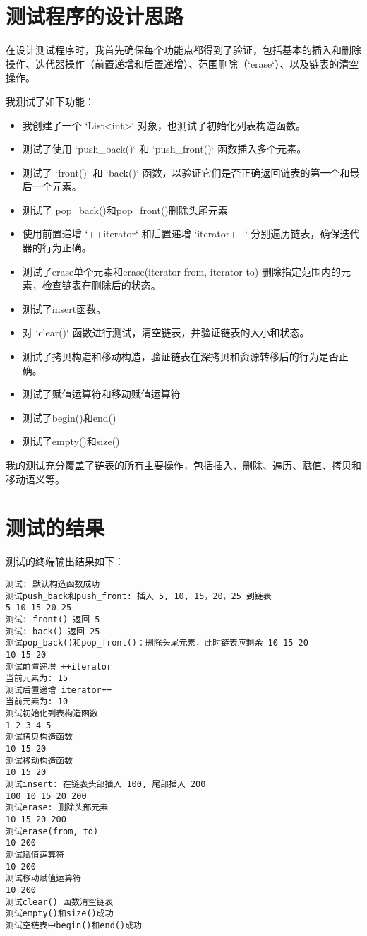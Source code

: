 \documentclass[UTF8]{ctexart}
\begin{document}
\pagestyle{fancy}
\fancyhead{}

\section{测试程序的设计思路}

在设计测试程序时，我首先确保每个功能点都得到了验证，包括基本的插入和删除操作、迭代器操作（前置递增和后置递增）、范围删除（`erase`）、以及链表的清空操作。

我测试了如下功能：
\begin{itemize}
    \item 我创建了一个 `List<int>` 对象，也测试了初始化列表构造函数。
    \item 测试了使用 `push\_back()` 和 `push\_front()` 函数插入多个元素。
    \item 测试了 `front()` 和 `back()` 函数，以验证它们是否正确返回链表的第一个和最后一个元素。
    \item 测试了 pop\_back()和pop\_front()删除头尾元素
    \item 使用前置递增 `++iterator` 和后置递增 `iterator++` 分别遍历链表，确保迭代器的行为正确。
    \item 测试了erase单个元素和erase(iterator from, iterator to) 删除指定范围内的元素，检查链表在删除后的状态。
    \item 测试了insert函数。
    \item 对 `clear()` 函数进行测试，清空链表，并验证链表的大小和状态。
    \item 测试了拷贝构造和移动构造，验证链表在深拷贝和资源转移后的行为是否正确。
    \item 测试了赋值运算符和移动赋值运算符
    \item 测试了begin()和end()
    \item 测试了empty()和size()
    
\end{itemize}

我的测试充分覆盖了链表的所有主要操作，包括插入、删除、遍历、赋值、拷贝和移动语义等。

\section{测试的结果}

测试的终端输出结果如下：
\begin{verbatim}
测试: 默认构造函数成功
测试push_back和push_front: 插入 5, 10, 15，20，25 到链表
5 10 15 20 25
测试: front() 返回 5
测试: back() 返回 25
测试pop_back()和pop_front()：删除头尾元素，此时链表应剩余 10 15 20
10 15 20
测试前置递增 ++iterator
当前元素为: 15
测试后置递增 iterator++
当前元素为: 10
测试初始化列表构造函数
1 2 3 4 5
测试拷贝构造函数
10 15 20
测试移动构造函数
10 15 20
测试insert: 在链表头部插入 100, 尾部插入 200
100 10 15 20 200
测试erase: 删除头部元素
10 15 20 200
测试erase(from, to)
10 200
测试赋值运算符
10 200
测试移动赋值运算符
10 200
测试clear() 函数清空链表
测试empty()和size()成功
测试空链表中begin()和end()成功
\end{verbatim}
\end{document}
